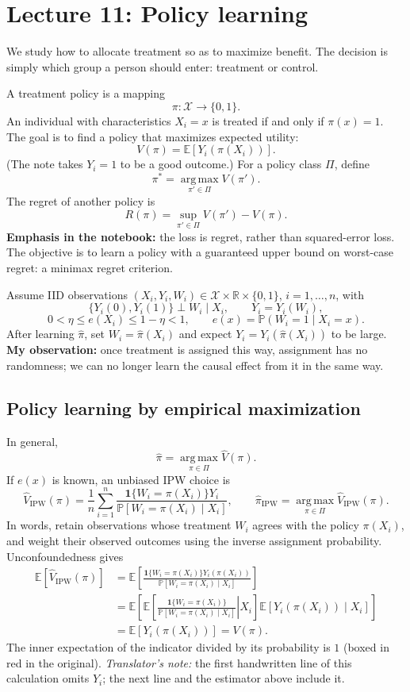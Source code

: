 \section{Lecture 11: Policy learning}
We study how to allocate treatment so as to maximize benefit. The decision is simply which group a person should enter: treatment or control.

A treatment policy is a mapping
\[
 \pi:\mathcal X\longrightarrow\{0,1\}.
\]
An individual with characteristics $X_i=x$ is treated if and only if $\pi(x)=1$. The goal is to find a policy that maximizes expected utility:
\[
 V(\pi)=\mathbb E[Y_i(\pi(X_i))].
\]
(The note takes $Y_i=1$ to be a good outcome.) For a policy class $\Pi$, define
\[
 \pi^*=\operatorname*{arg\,max}_{\pi'\in\Pi}V(\pi').
\]
The regret of another policy is
\[
 R(\pi)=\sup_{\pi'\in\Pi}V(\pi')-V(\pi).
\]
\textbf{Emphasis in the notebook:} the loss is regret, rather than squared-error loss. The objective is to learn a policy with a guaranteed upper bound on worst-case regret: a minimax regret criterion.

Assume IID observations $(X_i,Y_i,W_i)\in\mathcal X\times\mathbb R\times\{0,1\}$, $i=1,\ldots,n$, with
\[
 \{Y_i(0),Y_i(1)\}\perp W_i\mid X_i,\qquad Y_i=Y_i(W_i),
\]
\[
 0<\eta\le e(X_i)\le1-\eta<1,\qquad e(x)=\mathbb P(W_i=1\mid X_i=x).
\]
After learning $\widehat\pi$, set $W_i=\widehat\pi(X_i)$ and expect $Y_i=Y_i(\widehat\pi(X_i))$ to be large. \textbf{My observation:} once treatment is assigned this way, assignment has no randomness; we can no longer learn the causal effect from it in the same way.

\subsection{Policy learning by empirical maximization}
In general,
\[
 \widehat\pi=\operatorname*{arg\,max}_{\pi\in\Pi}\widehat V(\pi).
\]
If $e(x)$ is known, an unbiased IPW choice is
\[
 \widehat V_{\mathrm{IPW}}(\pi)
 =\frac1n\sum_{i=1}^n
 \frac{\mathbf1\{W_i=\pi(X_i)\}Y_i}
 {\mathbb P[W_i=\pi(X_i)\mid X_i]},
 \qquad
 \widehat\pi_{\mathrm{IPW}}
 =\operatorname*{arg\,max}_{\pi\in\Pi}\widehat V_{\mathrm{IPW}}(\pi).
\]
In words, retain observations whose treatment $W_i$ agrees with the policy $\pi(X_i)$, and weight their observed outcomes using the inverse assignment probability. Unconfoundedness gives
\begin{align*}
 \mathbb E[\widehat V_{\mathrm{IPW}}(\pi)]
 &=\mathbb E\left[
 \frac{\mathbf1\{W_i=\pi(X_i)\}Y_i(\pi(X_i))}
 {\mathbb P[W_i=\pi(X_i)\mid X_i]}\right]\\
 &=\mathbb E\left[
 \mathbb E\left[\left.
 \frac{\mathbf1\{W_i=\pi(X_i)\}}
 {\mathbb P[W_i=\pi(X_i)\mid X_i]}\right|X_i\right]
 \mathbb E[Y_i(\pi(X_i))\mid X_i]\right]\\
 &=\mathbb E[Y_i(\pi(X_i))]=V(\pi).
\end{align*}
The inner expectation of the indicator divided by its probability is $1$ (boxed in red in the original). \textit{Translator's note:} the first handwritten line of this calculation omits $Y_i$; the next line and the estimator above include it.

